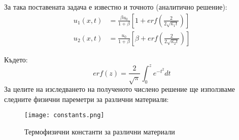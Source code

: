 За така поставената задача е известно и точното (аналитично решение):
\begin{align}
    u_{1}(x, t) &= \frac{\beta u_0}{1+\beta} \left[1 + erf(\frac{2}{2\sqrt{\kappa_1 t}})\right] \\
    u_{2}(x, t) &= \frac{u_0}{1+\beta} \left[\beta + erf(\frac{2}{2\sqrt{\kappa_2 t}})\right]  
\end{align}

Където: 
\begin{equation*}
    erf(z) = \frac{2}{\sqrt{\pi}} \displaystyle\int_{0}^{z} e ^{-t^2} dt
\end{equation*}
За целите на изследването на полученото числено решение ще използваме следните физични пареметри за различни материали:
\begin{figure}[h]
	\centering
	\texttt{[image: constants.png]}
	\caption{Термофизични константи за различни материали}
	\label{fig:constants}
\end{figure}

